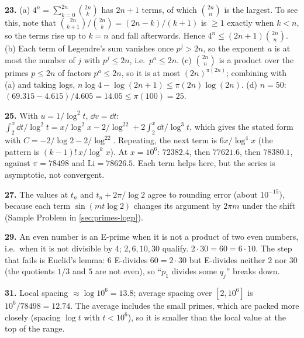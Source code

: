 \textbf{23.} (a) $4^n=\sum_{k=0}^{2n}\binom{2n}{k}$ has $2n+1$ terms, of which $\binom{2n}{n}$ is the largest. To see this, note that $\binom{2n}{k+1}/\binom{2n}{k}=(2n-k)/(k+1)$ is $\ge1$ exactly when $k<n$, so the terms rise up to $k=n$ and fall afterwards. Hence $4^n\le(2n+1)\binom{2n}{n}$. (b) Each term of Legendre's sum vanishes once $p^j>2n$, so the exponent $a$ is at most the number of $j$ with $p^j\le2n$, i.e.\ $p^a\le2n$. (c) $\binom{2n}{n}$ is a product over the primes $p\le2n$ of factors $p^a\le2n$, so it is at most $(2n)^{\pi(2n)}$; combining with (a) and taking logs, $n\log4-\log(2n+1)\le\pi(2n)\log(2n)$. (d) $n=50$: $(69.315-4.615)/4.605=14.05\le\pi(100)=25$.

\textbf{25.} With $u=1/\log^2t$, $\dd v=\dd t$: $\int_2^x\dd t/\log^2t=x/\log^2x-2/\log^22+2\int_2^x\dd t/\log^3t$, which gives the stated form with $C=-2/\log2-2/\log^22$. Repeating, the next term is $6x/\log^4x$ (the pattern is $(k-1)!\,x/\log^kx$). At $x=10^6$: $72382.4$, then $77621.6$, then $78380.1$, against $\pi=78498$ and $\mathrm{Li}=78626.5$. Each term helps here, but the series is asymptotic, not convergent.

\textbf{27.} The values at $t_n$ and $t_n+2\pi/\log2$ agree to rounding error (about $10^{-15}$), because each term $\sin(mt\log2)$ changes its argument by $2\pi m$ under the shift (Sample Problem in \cref{sec:primes-logp}).

\textbf{29.} An even number is an E-prime when it is not a product of two even numbers, i.e.\ when it is not divisible by 4; $2,6,10,30$ qualify. $2\cdot30=60=6\cdot10$. The step that fails is Euclid's lemma: $6$ E-divides $60=2\cdot30$ but E-divides neither $2$ nor $30$ (the quotients $1/3$ and $5$ are not even), so ``$p_1$ divides some $q_j$'' breaks down.

\textbf{31.} Local spacing $\approx\log10^6=13.8$; average spacing over $[2,10^6]$ is $10^6/78498=12.74$. The average includes the small primes, which are packed more closely (spacing $\log t$ with $t<10^6$), so it is smaller than the local value at the top of the range.

